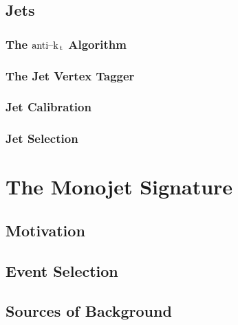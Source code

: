 \documentclass[10pt,twoside,cucitura,classica,english,openany]{toptesi}
\begin{document}
\section{Jets}
\label{sec:jets}



\subsection{The \emph{$\text{anti--k}_\mathrm{\, t}$} Algorithm}
\label{sec:anti-k_t}



\subsection{The Jet Vertex Tagger }
\label{sec:jet-vertex-tagger}



\subsection{Jet Calibration}
\label{sec:jet-calibration}



\subsection{Jet Selection}
\label{sec:jet-selection}



\chapter{The Monojet Signature}
\label{cha:monojet-signature}

\section{Motivation}
\label{sec:motivation}



\section{Event Selection}
\label{sec:event-selection}



\section{Sources of Background}
\label{sec:sources-background}
\end{document}
